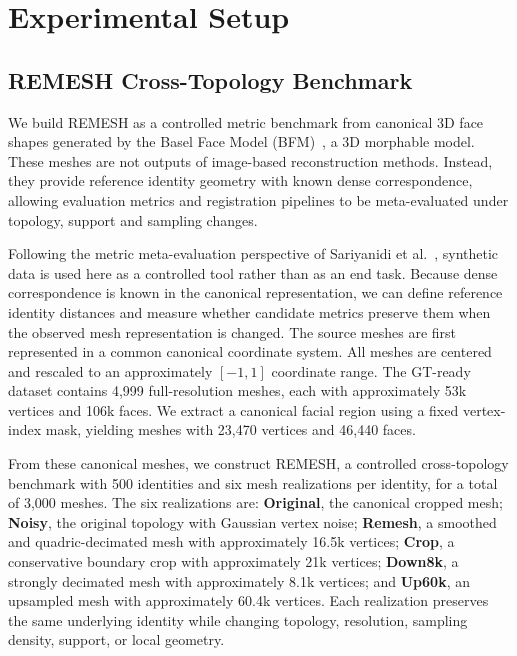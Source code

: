\documentclass{article}
\begin{document}
\section{Experimental Setup}
\label{sec:experimental_setup}

\subsection{REMESH Cross-Topology Benchmark}
\label{sec:remesh_benchmark}
We build REMESH as a controlled metric benchmark from canonical 3D face shapes generated by the Basel Face Model (BFM)~\cite{bfm}, a 3D morphable model. These meshes are not outputs of image-based reconstruction methods. Instead, they provide reference identity geometry with known dense correspondence, allowing evaluation metrics and registration pipelines to be meta-evaluated under topology, support and sampling changes.

Following the metric meta-evaluation perspective of
Sariyanidi et al.~\cite{10448898}, synthetic data is used here as a controlled tool rather than as an end task. Because dense correspondence is known in the canonical representation, we can define reference identity distances and measure whether candidate metrics preserve them when the observed mesh representation is changed. The source meshes are first represented in a common canonical coordinate system. All meshes are centered and rescaled to an approximately $[-1,1]$ coordinate range. The GT-ready dataset contains 4,999 full-resolution meshes, each with approximately 53k vertices and 106k faces. We extract a canonical facial region using a fixed vertex-index mask, yielding meshes with 23,470 vertices and 46,440 faces.

From these canonical meshes, we construct REMESH, a controlled cross-topology benchmark with 500 identities and six mesh realizations per identity, for a total of 3,000 meshes. The six realizations are: \textbf{Original}, the canonical cropped mesh;
\textbf{Noisy}, the original topology with Gaussian vertex noise; 
\textbf{Remesh}, a smoothed and quadric-decimated mesh with approximately 16.5k vertices;
\textbf{Crop}, a conservative boundary crop with approximately 21k vertices;
\textbf{Down8k}, a strongly decimated mesh with approximately 8.1k vertices; and
\textbf{Up60k}, an upsampled mesh with approximately 60.4k vertices.
Each realization preserves the same underlying identity while changing topology, resolution, sampling density, support, or local geometry.
\end{document}

